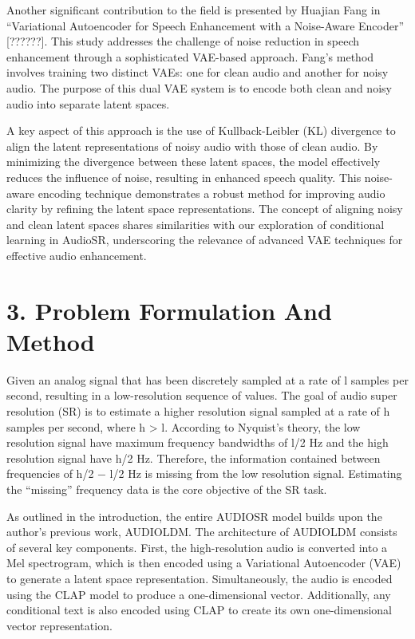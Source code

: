 \documentclass[
  ]{scrartcl}
\begin{document}
Another significant contribution to the field is presented by Huajian
Fang in ``Variational Autoencoder for Speech Enhancement with a
Noise-Aware Encoder'' {[}??????{]}. This study addresses the challenge
of noise reduction in speech enhancement through a sophisticated
VAE-based approach. Fang's method involves training two distinct VAEs:
one for clean audio and another for noisy audio. The purpose of this
dual VAE system is to encode both clean and noisy audio into separate
latent spaces.

A key aspect of this approach is the use of Kullback-Leibler (KL)
divergence to align the latent representations of noisy audio with those
of clean audio. By minimizing the divergence between these latent
spaces, the model effectively reduces the influence of noise, resulting
in enhanced speech quality. This noise-aware encoding technique
demonstrates a robust method for improving audio clarity by refining the
latent space representations. The concept of aligning noisy and clean
latent spaces shares similarities with our exploration of conditional
learning in AudioSR, underscoring the relevance of advanced VAE
techniques for effective audio enhancement.

\section{3. Problem Formulation And
Method}\label{problem-formulation-and-method}

Given an analog signal that has been discretely sampled at a rate of l
samples per second, resulting in a low-resolution sequence of values.
The goal of audio super resolution (SR) is to estimate a higher
resolution signal sampled at a rate of h samples per second, where h
\textgreater{} l. According to Nyquist's theory, the low resolution
signal have maximum frequency bandwidths of l/2 Hz and the high
resolution signal have h/2 Hz. Therefore, the information contained
between frequencies of h/2 − l/2 Hz is missing from the low resolution
signal. Estimating the ``missing'' frequency data is the core objective
of the SR task.

As outlined in the introduction, the entire AUDIOSR model builds upon
the author's previous work, AUDIOLDM. The architecture of AUDIOLDM
consists of several key components. First, the high-resolution audio is
converted into a Mel spectrogram, which is then encoded using a
Variational Autoencoder (VAE) to generate a latent space representation.
Simultaneously, the audio is encoded using the CLAP model to produce a
one-dimensional vector. Additionally, any conditional text is also
encoded using CLAP to create its own one-dimensional vector
representation.
\end{document}
